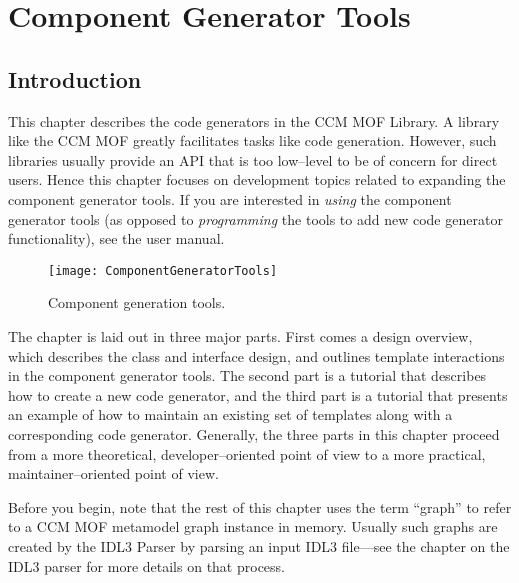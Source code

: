 \chapter{Component Generator Tools}

\section{Introduction}

This chapter describes the code generators in the CCM MOF Library. A library
like the CCM MOF greatly facilitates tasks like code generation. However, such
libraries usually provide an API that is too low--level to be of concern for
direct users. Hence this chapter focuses on development topics related to
expanding the component generator tools. If you are interested in {\it using\/}
the component generator tools (as opposed to {\it programming\/} the tools to
add new code generator functionality), see the user manual.

\begin{figure}
\centering
\texttt{[image: ComponentGeneratorTools]}
\caption{Component generation tools.}
\label{fig:component-generator-tools}
\end{figure}

The chapter is laid out in three major parts. First comes a design overview,
which describes the class and interface design, and outlines template
interactions in the component generator tools. The second part is a tutorial
that describes how to create a new code generator, and the third part is a
tutorial that presents an example of how to maintain an existing set of
templates along with a corresponding code generator. Generally, the three parts
in this chapter proceed from a more theoretical, developer--oriented point of
view to a more practical, maintainer--oriented point of view.

Before you begin, note that the rest of this chapter uses the term ``graph'' to
refer to a CCM MOF metamodel graph instance in memory. Usually such graphs are
created by the IDL3 Parser by parsing an input IDL3 file---see the chapter on
the IDL3 parser for more details on that process.

